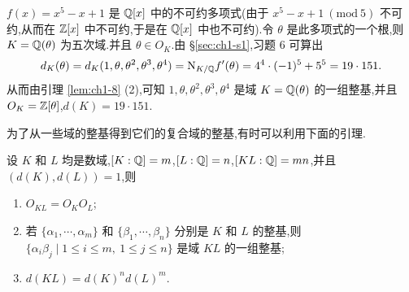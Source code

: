 \begin{example}\label{ex:ch1-2-5}
$f(x)=x^5-x+1$ 是 $\mathbb{Q}[x]$ 中的不可约多项式(由于 $x^5-x+1\ (\mathrm{mod}\ 5)$ 不可约,从而在 $\mathbb{Z}[x]$ 中不可约,于是在 $\mathbb{Q}[x]$ 中也不可约).令 $\theta$ 是此多项式的一个根,则 $K=\mathbb{Q}(\theta)$ 为五次域.并且 $\theta\in O_K$.由 \S\ref{sec:ch1-s1},习题 6 可算出
\[
  d_K(\theta)=d_K(1,\theta,\theta^2,\theta^3,\theta^4)
  =\mathrm{N}_{K/\mathbb{Q}}f'(\theta)=4^4\cdot(-1)^5+5^5=19\cdot151.
\]
从而由引理 \ref{lem:ch1-8} (2),可知 $1,\theta,\theta^2,\theta^3,\theta^4$ 是域 $K=\mathbb{Q}(\theta)$ 的一组整基,并且 $O_K=\mathbb{Z}[\theta]$,$d(K)=19\cdot151$.
\end{example}

为了从一些域的整基得到它们的复合域的整基,有时可以利用下面的引理.

\begin{lemma}\label{lem:ch1-9}
设 $K$ 和 $L$ 均是数域,$[K:\mathbb{Q}]=m$,$[L:\mathbb{Q}]=n$,$[KL:\mathbb{Q}]=mn$,并且 $(d(K),d(L))=1$,则
\begin{enumerate}[(1)]
  \item $O_{KL}=O_KO_L$;
  \item 若 $\{\alpha_1,\cdots,\alpha_m\}$ 和 $\{\beta_1,\cdots,\beta_n\}$ 分别是 $K$ 和 $L$ 的整基,则 $\{\alpha_i\beta_j\mid 1\leqslant i\leqslant m,\ 1\leqslant j\leqslant n\}$ 是域 $KL$ 的一组整基;
  \item $d(KL)=d(K)^nd(L)^m$.
\end{enumerate}
\end{lemma}

